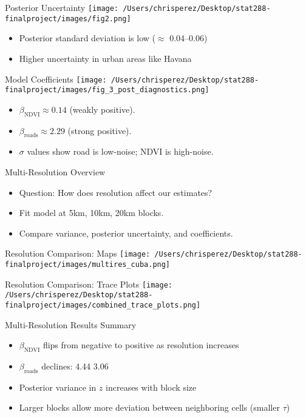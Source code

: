 \documentclass{beamer}
\begin{document}
\begin{frame}{Posterior Uncertainty}
\centering
\texttt{[image: /Users/chrisperez/Desktop/stat288-finalproject/images/fig2.png]}
\begin{itemize}
  \item Posterior standard deviation is low ($\approx$ 0.04--0.06)
  \item Higher uncertainty in urban areas like Havana
\end{itemize}

\end{frame}

\begin{frame}{Model Coefficients}
\centering
\texttt{[image: /Users/chrisperez/Desktop/stat288-finalproject/images/fig\_3\_post\_diagnostics.png]}
\begin{itemize}
  \item $\beta_{\text{NDVI}} \approx 0.14$ (weakly positive).
  \item $\beta_{\text{roads}} \approx 2.29$ (strong positive).
  \item $\sigma$ values show road is low-noise; NDVI is high-noise.
\end{itemize}
\end{frame}

\begin{frame}{Multi-Resolution Overview}
  \begin{itemize}
    \item Question: How does resolution affect our estimates?
    \item Fit model at 5km, 10km, 20km blocks.
    \item Compare variance, posterior uncertainty, and coefficients.
  \end{itemize}
  \end{frame}
  
\begin{frame}{Resolution Comparison: Maps}
    \texttt{[image: /Users/chrisperez/Desktop/stat288-finalproject/images/multires\_cuba.png]}
\end{frame}


\begin{frame}{Resolution Comparison: Trace Plots}
    \texttt{[image: /Users/chrisperez/Desktop/stat288-finalproject/images/combined\_trace\_plots.png]}
\end{frame}


  \begin{frame}{Multi-Resolution Results Summary}
    \begin{itemize}
      \item $\beta_{\text{NDVI}}$ flips from negative to positive as resolution increases
      \item $\beta_{\text{roads}}$ declines: 4.44 \textrightarrow{} 3.06
      \item Posterior variance in $z$ increases with block size
      \item Larger blocks allow more deviation between neighboring cells (smaller $\tau$)
    \end{itemize}
    \end{frame}
    
\end{document}

